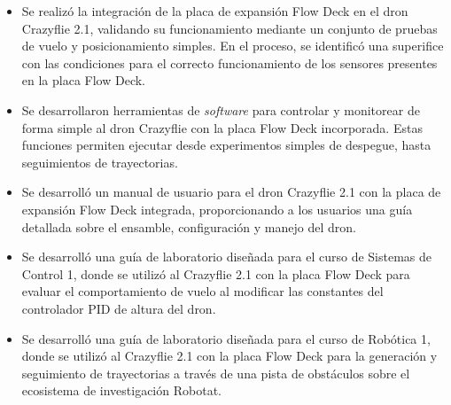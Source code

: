 \begin{itemize}
	\item Se realizó la integración de la placa de expansión Flow Deck en el dron Crazyflie 2.1, validando su funcionamiento mediante un conjunto de pruebas de vuelo y posicionamiento simples. En el proceso, se identificó una superifice con las condiciones para el correcto funcionamiento de los sensores presentes en la placa Flow Deck.
	
	\item Se desarrollaron herramientas de \textit{software} para controlar y monitorear de forma simple al dron Crazyflie con la placa Flow Deck incorporada. Estas funciones permiten ejecutar desde experimentos simples de despegue, hasta seguimientos de trayectorias.
	
	\item Se desarrolló un manual de usuario para el dron Crazyflie 2.1 con la placa de expansión Flow Deck integrada, proporcionando a los usuarios una guía detallada sobre el ensamble, configuración y manejo del dron. 	
	
	\item Se desarrolló una guía de laboratorio diseñada para el curso de Sistemas de Control 1, donde se utilizó al Crazyflie 2.1 con la placa Flow Deck para evaluar el comportamiento de vuelo al modificar las constantes del controlador PID de altura del dron.
	
	\item Se desarrolló una guía de laboratorio diseñada para el curso de Robótica 1, donde se utilizó al Crazyflie 2.1 con la placa Flow Deck para la generación y seguimiento de trayectorias a través de una pista de obstáculos sobre el ecosistema de investigación Robotat.
\end{itemize}
